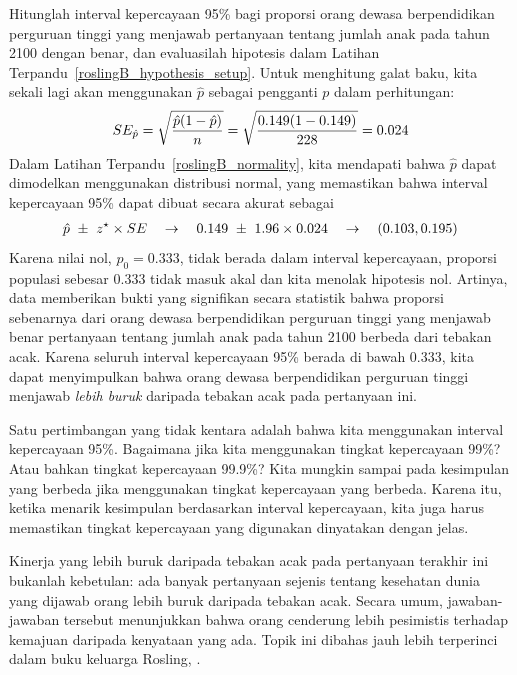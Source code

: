 \begin{examplewrap}
\begin{nexample}{Hitunglah interval kepercayaan 95\% bagi
    proporsi orang dewasa berpendidikan perguruan tinggi yang menjawab
    pertanyaan tentang jumlah anak pada tahun 2100 dengan benar, dan evaluasilah
    hipotesis dalam Latihan
    Terpandu~\ref{roslingB_hypothesis_setup}.}
  Untuk menghitung galat baku, kita sekali lagi akan menggunakan
  $\hat{p}$
  sebagai pengganti $p$ dalam perhitungan:
  \begin{align*}
  SE_{\hat{p}}
      = \sqrt{\frac{\hat{p}(1 - \hat{p})}{n}}
      = \sqrt{\frac{0.149{}(1 - 0.149{})}
          {228{}}}
      = 0.024{}
  \end{align*}
  Dalam Latihan Terpandu~\ref{roslingB_normality},
  kita mendapati bahwa $\hat{p}$ dapat dimodelkan menggunakan
  distribusi normal,
  yang memastikan bahwa interval kepercayaan 95\% dapat
  dibuat secara akurat sebagai
  \begin{align*}
  \hat{p}~\pm~z^{\star} \times SE
  \quad\to\quad
  0.149{}~\pm~1.96 \times 0.024{}
  \quad\to\quad
  (0.103, 0.195)
  \end{align*}
  Karena nilai nol, $p_0 = 0.333$, tidak berada dalam
  interval kepercayaan, proporsi populasi sebesar 0.333
  tidak masuk akal dan kita menolak hipotesis nol.
  Artinya, data memberikan bukti yang signifikan secara statistik
  bahwa proporsi sebenarnya dari orang dewasa berpendidikan perguruan tinggi
  yang menjawab benar pertanyaan tentang jumlah anak pada tahun 2100
  berbeda dari tebakan acak. Karena seluruh
  interval kepercayaan 95\%
  berada di bawah 0.333, kita dapat menyimpulkan bahwa orang dewasa
  berpendidikan perguruan tinggi menjawab \emph{lebih buruk} daripada tebakan acak
  pada pertanyaan ini.

  Satu pertimbangan yang tidak kentara adalah bahwa kita menggunakan
  interval kepercayaan 95\%.
  Bagaimana jika kita menggunakan tingkat kepercayaan 99\%?
  Atau bahkan tingkat kepercayaan 99.9\%?
  Kita mungkin sampai pada kesimpulan yang berbeda
  jika menggunakan tingkat kepercayaan yang berbeda.
  Karena itu, ketika menarik kesimpulan berdasarkan
  interval kepercayaan, kita juga harus memastikan
  tingkat kepercayaan yang digunakan dinyatakan dengan jelas.
\end{nexample}
\end{examplewrap}

Kinerja yang lebih buruk daripada tebakan acak pada
pertanyaan terakhir ini bukanlah kebetulan:
ada banyak pertanyaan sejenis tentang kesehatan dunia yang dijawab orang
lebih buruk daripada tebakan acak.
Secara umum, jawaban-jawaban tersebut menunjukkan bahwa orang cenderung
lebih pesimistis terhadap kemajuan daripada kenyataan yang ada.
Topik ini dibahas jauh lebih terperinci dalam
buku keluarga Rosling,
\emph{}.


